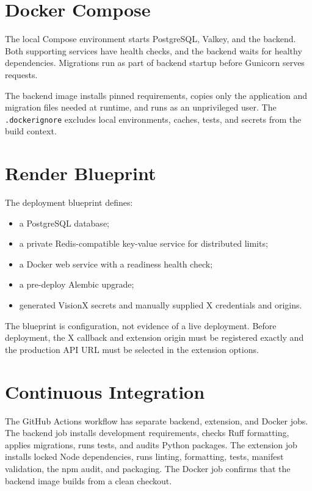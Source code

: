 \documentclass[11pt,a4paper]{report}
\newcommand{\code}[1]{\texttt{#1}}
\begin{document}
\section{Docker Compose}
The local Compose environment starts PostgreSQL, Valkey, and the backend. Both
supporting services have health checks, and the backend waits for healthy
dependencies. Migrations run as part of backend startup before Gunicorn serves
requests.

The backend image installs pinned requirements, copies only the application
and migration files needed at runtime, and runs as an unprivileged user. The
\code{.dockerignore} excludes local environments, caches, tests, and secrets
from the build context.

\section{Render Blueprint}
The deployment blueprint defines:

\begin{itemize}
  \item a PostgreSQL database;
  \item a private Redis-compatible key-value service for distributed limits;
  \item a Docker web service with a readiness health check;
  \item a pre-deploy Alembic upgrade;
  \item generated VisionX secrets and manually supplied X credentials and
  origins.
\end{itemize}

The blueprint is configuration, not evidence of a live deployment. Before
deployment, the X callback and extension origin must be registered exactly and
the production API URL must be selected in the extension options.

\section{Continuous Integration}
The GitHub Actions workflow has separate backend, extension, and Docker jobs.
The backend job installs development requirements, checks Ruff formatting,
applies migrations, runs tests, and audits Python packages. The extension job
installs locked Node dependencies, runs linting, formatting, tests, manifest
validation, the npm audit, and packaging. The Docker job confirms that the
backend image builds from a clean checkout.
\end{document}
